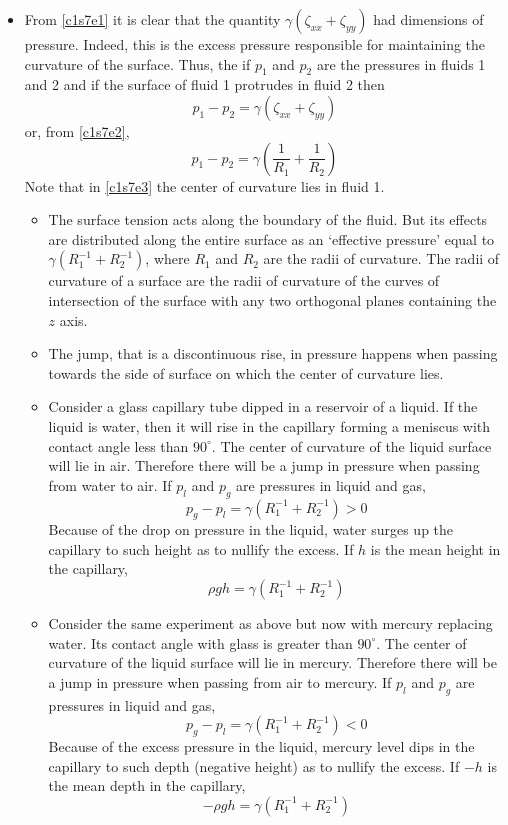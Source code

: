 \begin{itemize}
\item From \eqref{c1s7e1} it is clear that the quantity $\gamma(\zeta_{xx} + \zeta_{yy})$ had dimensions of pressure. Indeed, this is the excess pressure responsible for maintaining the 
curvature of the surface. Thus, the if $p_1$ and $p_2$ are the pressures in fluids 1 and 2 and if the surface of fluid 1 protrudes in fluid 2 then
\[
p_1 - p_2 = \gamma(\zeta_{xx} + \zeta_{yy})
\]
or, from \eqref{c1s7e2},
\begin{equation}\label{c1s7e3}
p_1 - p_2 = \gamma\left(\frac{1}{R_1} + \frac{1}{R_2}\right)
\end{equation}
Note that in \eqref{c1s7e3} the center of curvature lies in fluid 1.
\begin{itemize}
\item The surface tension acts along the boundary of the fluid. But its effects are distributed along the entire surface as an \enquote*{effective pressure} equal to 
$\gamma(R_1^{-1} + R_2^{-1})$, where $R_1$ and $R_2$ are the radii of curvature. The radii of curvature of a surface are the radii of curvature of the curves of intersection of the
surface with any two orthogonal planes containing the $z$ axis.

\item The jump, that is a discontinuous rise, in pressure happens when passing towards the side of surface on which the center of curvature lies.

\item Consider a glass capillary tube dipped in a reservoir of a liquid. If the liquid is water, then it will rise in the capillary forming a meniscus with contact angle less than 
$90^\circ$. The center of curvature of the liquid surface will lie in air. Therefore there will be a jump in pressure when passing from water to air. If $p_l$ and $p_g$ are pressures in 
liquid and gas,
\[
p_g - p_l = \gamma(R_1^{-1} + R_2^{-1}) > 0
\]
Because of the drop on pressure in the liquid, water surges up the capillary to such height as to nullify the excess. If $h$ is the mean height in the capillary,
\[
\rho g h = \gamma(R_1^{-1} + R_2^{-1})
\]

\item Consider the same experiment as above but now with mercury replacing water. Its contact angle with glass is greater than $90^\circ$. The center of curvature of the liquid surface 
will lie in mercury. Therefore there will be a jump in pressure when passing from air to mercury. If $p_l$ and $p_g$ are pressures in liquid and gas,
\[
p_g - p_l = \gamma(R_1^{-1} + R_2^{-1}) < 0
\]
Because of the excess pressure in the liquid, mercury level dips in the capillary to such depth (negative height) as to nullify the excess. If $-h$ is the mean depth in the capillary,
\[
-\rho g h = \gamma(R_1^{-1} + R_2^{-1})
\]
\end{itemize}


\end{itemize}
